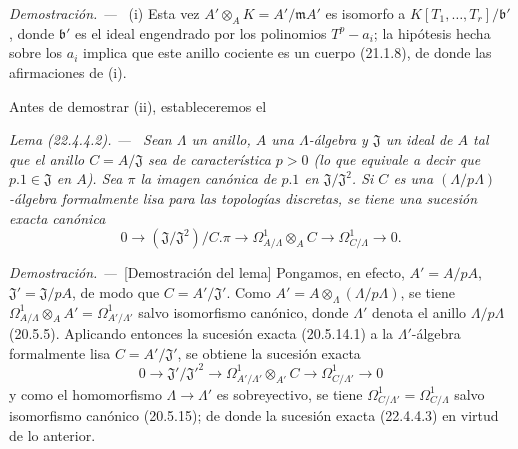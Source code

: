 \documentclass[10pt,oneside]{book}
\makeatletter
\newcommand{\setmanualcurrentlabel}[1]{\def\@currentlabel{#1}}
\newenvironment{lemma}[1][]{%
  \setmanualcurrentlabel{#1}\par\medskip\noindent\itshape Lema (#1). ---\ }{\par}
\newenvironment{proof}{%
  \par\medskip\noindent\textit{Demostración. ---\ }}{\par}
\providecommand{\setmin}{-}%
\makeatother
\begin{document}
\begin{proof}
(i) Esta vez $A'\otimes_AK=A'/\mathfrak mA'$ es isomorfo a
$K[T_1,\ldots,T_r]/\mathfrak b'$, donde $\mathfrak b'$ es el ideal engendrado
por los polinomios $T^p\setmin a_i$; la hipótesis hecha sobre los $a_i$ implica que
este anillo cociente es un cuerpo (21.1.8), de donde las afirmaciones de (i).

Antes de demostrar (ii), estableceremos el

\begin{lemma}[22.4.4.2]
\label{0.22.4.4.2-es}
Sean $\Lambda$ un anillo, $A$ una $\Lambda$-álgebra y $\mathfrak J$ un
ideal de $A$ tal que el anillo $C=A/\mathfrak J$ sea de característica
$p>0$ (lo que equivale a decir que $p.1\in\mathfrak J$ en $A$). Sea
$\pi$ la imagen canónica de $p.1$ en
$\mathfrak J/\mathfrak J^2$. Si $C$ es una $(\Lambda/p\Lambda)$-álgebra
formalmente lisa para las topologías discretas, se tiene una sucesión exacta
canónica
\begin{equation}
\label{0.22.4.4.3-es}
  0\longrightarrow(\mathfrak J/\mathfrak J^2)/C.\pi
  \longrightarrow\Omega^1_{A/\Lambda}\otimes_AC
  \longrightarrow\Omega^1_{C/\Lambda}\longrightarrow0.
  \tag{22.4.4.3}
\end{equation}
\end{lemma}

\begin{proof}[Demostración del lema]
Pongamos, en efecto, $A'=A/pA$, $\mathfrak J'=\mathfrak J/pA$, de modo que
$C=A'/\mathfrak J'$. Como
$A'=A\otimes_\Lambda(\Lambda/p\Lambda)$, se tiene
$\Omega^1_{A/\Lambda}\otimes_AA'=\Omega^1_{A'/\Lambda'}$ salvo
isomorfismo canónico, donde $\Lambda'$ denota el anillo
$\Lambda/p\Lambda$ (20.5.5). Aplicando entonces la sucesión exacta (20.5.14.1) a
la $\Lambda'$-álgebra formalmente lisa $C=A'/\mathfrak J'$, se obtiene la
sucesión exacta
\[
  0\longrightarrow\mathfrak J'/\mathfrak J'^2
  \longrightarrow\Omega^1_{A'/\Lambda'}\otimes_{A'}C
  \longrightarrow\Omega^1_{C/\Lambda'}\longrightarrow0
\]
y como el homomorfismo $\Lambda\to\Lambda'$ es sobreyectivo, se tiene
$\Omega^1_{C/\Lambda'}=\Omega^1_{C/\Lambda}$ salvo isomorfismo canónico
(20.5.15); de donde la sucesión exacta (22.4.4.3) en virtud de lo anterior.
\end{proof}


\end{proof}
\end{document}
